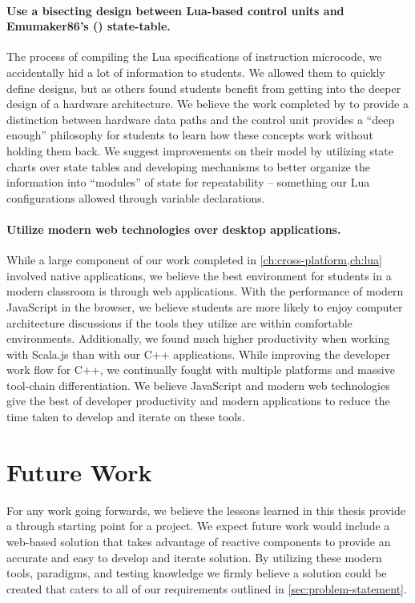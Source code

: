 \paragraph{Use a bisecting design between Lua-based control units and Emumaker86's (\cite{Black2013}) state-table.} The process of compiling the Lua specifications of instruction microcode, we accidentally hid a lot of information to students. We allowed them to quickly define designs, but as others found \cite{Ackovska2014,Djordjevic2005,McLoughlin2010,Nakamura2013,Black2013} students benefit from getting into the deeper design of a hardware architecture. We believe the work completed by \cite{Black2013} to provide a distinction between hardware data paths and the control unit provides a ``deep enough'' philosophy for students to learn how these concepts work without holding them back. We suggest improvements on their model by utilizing state charts over state tables and developing mechanisms to better organize the information into ``modules'' of state for repeatability -- something our Lua configurations allowed through variable declarations. 

\paragraph{Utilize modern web technologies over desktop applications.} While a large component of our work completed in \cref{ch:cross-platform,ch:lua} involved native applications, we believe the best environment for students in a modern classroom is through web applications. With the performance of modern JavaScript in the browser, we believe students are more likely to enjoy computer architecture discussions if the tools they utilize are within comfortable environments. Additionally, we found much higher productivity when working with Scala.js than with our C++ applications. While improving the developer work flow for C++, we continually fought with multiple platforms and massive tool-chain differentiation. We believe JavaScript and modern web technologies give the best of developer productivity and modern applications to reduce the time taken to develop and iterate on these tools. 

\section{Future Work}

For any work going forwards, we believe the lessons learned in this thesis provide a through starting point for a project. We expect future work would include a web-based solution that takes advantage of reactive components to provide an accurate and easy to develop and iterate solution. By utilizing these modern tools, paradigms, and testing knowledge we firmly believe a solution could be created that caters to all of our requirements outlined in \cref{sec:problem-statement}. 
